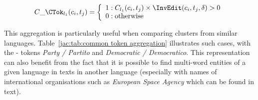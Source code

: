 \documentclass[output=paper]{langsci/langscibook}
\begin{document}
\begin{equation}
C\_\CTok_{l_{1}}(c_i,t_j) =
\left\{
  \begin{array}{lr}
    1 : C_{l_{1}}(c_i,t_j) \times \InvEdit(c_i,t_j,\delta) > 0\\
    0 : \text{otherwise}
  \end{array}
\right.
\end{equation}

This aggregation is particularly useful when comparing clusters from
similar languages. Table~\ref{jac:tab:common token aggregation}
illustrates such cases, with the - tokens
\textit{Party / Partito} and \textit{Democratic / Democratico}. This
representation can also benefit from the fact that it is possible to
find multi-word entities of a given language in texts in another
language (especially with names of international organisations such as
\textit{European Space Agency} which can be found in  text).



\label{jac:translated}

\end{document}
